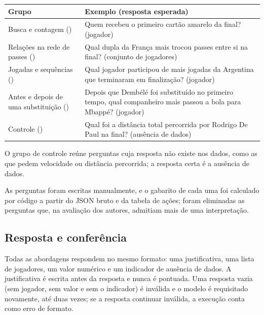 \vspace{2mm}
\noindent\begin{minipage}{\columnwidth}
\centering\small\renewcommand{\arraystretch}{1.15}
\begin{tabular}{>{\raggedright\arraybackslash}p{}>{\raggedright\arraybackslash}p{}} %
\toprule
Grupo & Exemplo (resposta esperada) \\
\midrule
Busca e contagem (\nGroupSearch{}) & Quem recebeu o primeiro cartão amarelo da final? (jogador) \\
Relações na rede de passes (\nGroupRelations{}) & Qual dupla da França mais trocou passes entre si na final? (conjunto de jogadores) \\
Jogadas e sequências (\nGroupPlays{}) & Qual jogador participou de mais jogadas da Argentina que terminaram em finalização? (jogador) \\
Antes e depois de uma substituição (\nGroupMoments{}) & Depois que Dembélé foi substituído no primeiro tempo, qual companheiro mais passou a bola para Mbappé? (jogador) \\
Controle (\nGroupControl{}) & Qual foi a distância total percorrida por Rodrigo De Paul na final? (ausência de dados) \\
\bottomrule
\end{tabular}
\label{tab:perguntas}
\end{minipage}\par\smallskip

O grupo de controle reúne perguntas cuja resposta não existe nos dados, como as que pedem velocidade ou distância
percorrida; a resposta certa é a ausência de dados.

As perguntas foram escritas manualmente, e o gabarito de cada uma foi calculado por código a partir do JSON bruto e
da tabela de ações; foram eliminadas as perguntas que, na avaliação dos autores, admitiam mais de uma
interpretação.

\subsection{Resposta e conferência}\label{sec:conferencia}

Todas as abordagens respondem no mesmo formato: uma justificativa, uma lista de jogadores, um valor numérico e um
indicador de ausência de dados. A justificativa é escrita antes da resposta e nunca é pontuada. Uma resposta vazia
(sem jogador, sem valor e sem o indicador) é inválida e o modelo é requisitado novamente, até duas vezes; se a resposta
continuar inválida, a execução conta como erro de formato.

